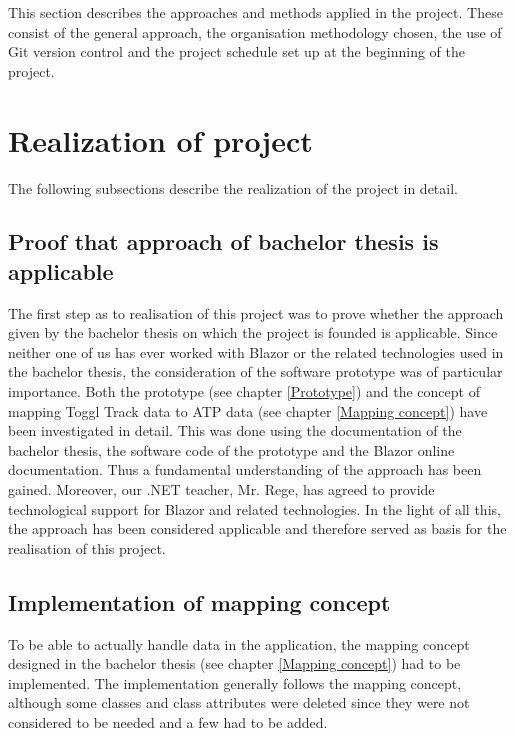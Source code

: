 
This section describes the approaches and methods applied in the project. These consist of the general approach, the organisation methodology chosen, the use of Git version control and the project schedule set up at the beginning of the project.

\section{Realization of project}
The following subsections describe the realization of the project in detail.

\subsection{Proof that approach of bachelor thesis is applicable}
The first step as to realisation of this project was to prove whether the approach given by the bachelor thesis on which the project is founded is applicable. Since neither one of us has ever worked with Blazor or the related technologies used in the bachelor thesis, the consideration of the software prototype was of particular importance. Both the prototype (see chapter \ref{Prototype}) and the concept of mapping Toggl Track data to ATP data (see chapter \ref{Mapping concept}) have been investigated in detail. This was done using the documentation of the bachelor thesis, the software code of the prototype and the Blazor online documentation. Thus a fundamental understanding of the approach has been gained. Moreover, our .NET teacher, Mr. Rege, has agreed to provide technological support for Blazor and related technologies. In the light of all this, the approach has been considered applicable and therefore served as basis for the realisation of this project.

\subsection{Implementation of mapping concept}
To be able to actually handle data in the application, the mapping concept designed in the bachelor thesis (see chapter \ref{Mapping concept}) had to be implemented. The implementation generally follows the mapping concept, although some classes and class attributes were deleted since they were not considered to be needed and a few had to be added.

